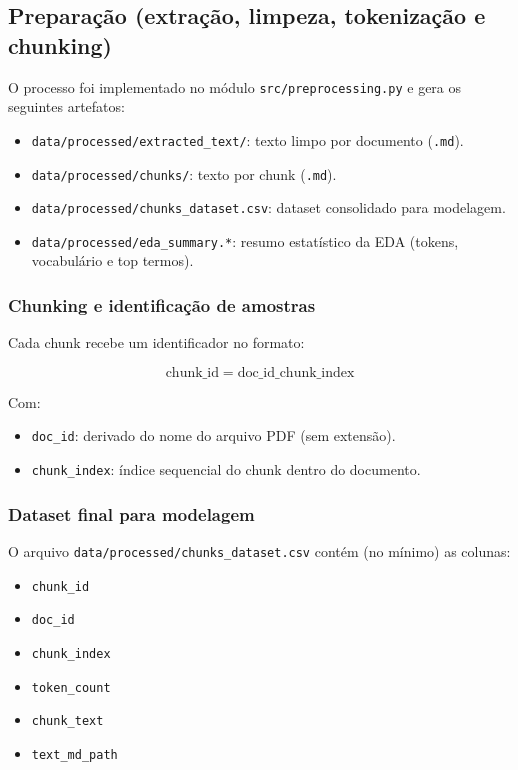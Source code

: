 \documentclass[12pt,a4paper]{article}
\begin{document}
\subsection{Preparação (extração, limpeza, tokenização e chunking)}

O processo foi implementado no módulo \texttt{src/preprocessing.py} e gera os seguintes artefatos:

\begin{itemize}[leftmargin=1.2cm]
    \item \texttt{data/processed/extracted\_text/}: texto limpo por documento (\texttt{.md}).
    \item \texttt{data/processed/chunks/}: texto por chunk (\texttt{.md}).
    \item \texttt{data/processed/chunks\_dataset.csv}: dataset consolidado para modelagem.
    \item \texttt{data/processed/eda\_summary.*}: resumo estatístico da EDA (tokens, vocabulário e top termos).
\end{itemize}

\subsubsection{Chunking e identificação de amostras}

Cada chunk recebe um identificador no formato:

\[
 \text{chunk\_id} = \text{doc\_id}\_\text{chunk\_index}
 \]

Com:
\begin{itemize}[leftmargin=1.2cm]
    \item \texttt{doc\_id}: derivado do nome do arquivo PDF (sem extensão).
    \item \texttt{chunk\_index}: índice sequencial do chunk dentro do documento.
\end{itemize}

\subsubsection{Dataset final para modelagem}

O arquivo \texttt{data/processed/chunks\_dataset.csv} contém (no mínimo) as colunas:

\begin{itemize}[leftmargin=1.2cm]
    \item \texttt{chunk\_id}
    \item \texttt{doc\_id}
    \item \texttt{chunk\_index}
    \item \texttt{token\_count}
    \item \texttt{chunk\_text}
    \item \texttt{text\_md\_path}
\end{itemize}
\end{document}
